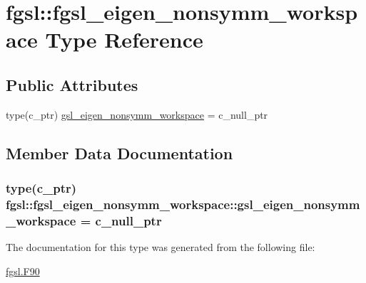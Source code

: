 \hypertarget{structfgsl_1_1fgsl__eigen__nonsymm__workspace}{}\section{fgsl\+:\+:fgsl\+\_\+eigen\+\_\+nonsymm\+\_\+workspace Type Reference}
\label{structfgsl_1_1fgsl__eigen__nonsymm__workspace}
\subsection*{Public Attributes}
\begin{DoxyCompactItemize}
\item 
type(c\+\_\+ptr) \hyperlink{structfgsl_1_1fgsl__eigen__nonsymm__workspace_a6588dacfb8c71634b2b0b4ae86637323}{gsl\+\_\+eigen\+\_\+nonsymm\+\_\+workspace} = c\+\_\+null\+\_\+ptr
\end{DoxyCompactItemize}


\subsection{Member Data Documentation}
\hypertarget{structfgsl_1_1fgsl__eigen__nonsymm__workspace_a6588dacfb8c71634b2b0b4ae86637323}{}
\subsubsection[{gsl\+\_\+eigen\+\_\+nonsymm\+\_\+workspace}]{\setlength{\rightskip}{0pt plus 5cm}type(c\+\_\+ptr) fgsl\+::fgsl\+\_\+eigen\+\_\+nonsymm\+\_\+workspace\+::gsl\+\_\+eigen\+\_\+nonsymm\+\_\+workspace = c\+\_\+null\+\_\+ptr}\label{structfgsl_1_1fgsl__eigen__nonsymm__workspace_a6588dacfb8c71634b2b0b4ae86637323}


The documentation for this type was generated from the following file\+:\begin{DoxyCompactItemize}
\item 
\hyperlink{fgsl_8F90}{fgsl.\+F90}\end{DoxyCompactItemize}
